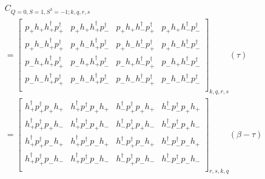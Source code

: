 \renewcommand{\cor}[4]{p_{#1}h_{#2}h^\dagger_{#3}p^\dagger_{#4}}
\newcommand{\dcor}[4]{h_{#3}^\dagger p_{#4}^\dagger p_{#1} h_{#2}}
\begin{equation}
  \begin{aligned}
    &C_{Q=0,S=1,S^3=-1;k,q,r,s} \\
    &= \left[ 
    {\begin{array}{cccc}
      \cor{+}{+}{+}{+} & \cor{+}{+}{+}{-} & \cor{+}{+}{-}{+} & \cor{+}{+}{-}{-} \\
      \cor{+}{-}{+}{+} & \cor{+}{-}{+}{-} & \cor{+}{-}{-}{+} & \cor{+}{-}{-}{-} \\
      \cor{-}{+}{+}{+} & \cor{-}{+}{+}{-} & \cor{-}{+}{-}{+} & \cor{-}{+}{-}{-} \\
      \cor{-}{-}{+}{+} & \cor{-}{-}{+}{-} & \cor{-}{-}{-}{+} & \cor{-}{-}{-}{-} \\
    \end{array} } \right]_{k,q,r,s} (\tau) \\
    &= \left[ 
    {\begin{array}{cccc}
      \dcor{+}{+}{+}{+} & \dcor{+}{+}{+}{-} & \dcor{+}{+}{-}{+} & \dcor{+}{+}{-}{-} \\
      \dcor{+}{-}{+}{+} & \dcor{+}{-}{+}{-} & \dcor{+}{-}{-}{+} & \dcor{+}{-}{-}{-} \\
      \dcor{-}{+}{+}{+} & \dcor{-}{+}{+}{-} & \dcor{-}{+}{-}{+} & \dcor{-}{+}{-}{-} \\
      \dcor{-}{-}{+}{+} & \dcor{-}{-}{+}{-} & \dcor{-}{-}{-}{+} & \dcor{-}{-}{-}{-} \\
    \end{array} } \right]_{r,s,k,q} (\beta-\tau) \\
  \end{aligned}
\end{equation}

\renewcommand{\dcor}[4]{p_{#4}^\dagger h_{#3}^\dagger h_{#2} p_{#1}}

